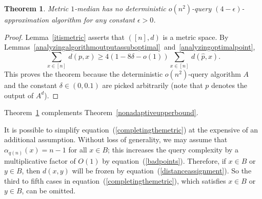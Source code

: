 \documentclass[letterpaper,12pt]{article}
\newtheorem{theorem}{Theorem}
\begin{document}
\begin{theorem}\label{maintheorem}
{\sc Metric $1$-median} has no deterministic $o(n^2)$-query
$(4-\epsilon)$-approximation algorithm for any constant $\epsilon>0$.
\end{theorem}
\begin{proof}
Lemma~\ref{itismetric} asserts that $([n],d)$ is a metric space.
By
Lemmas~\ref{analyzingalgorithmoutputassuboptimal}~and~\ref{analyzingoptimalpoint},
$$
\sum_{x\in[n]}\,d\left(p,x\right)
\ge 4\left(1-8\delta-o(1)\right)\sum_{x\in[n]}\, d\left(\hat{p},x\right).
$$
This proves the theorem because
the deterministic $o(n^2)$-query algorithm $A$
and
the constant $\delta\in(0,0.1)$
are picked arbitrarily (note that $p$ denotes the output of $A^d$).
\end{proof}

Theorem~\ref{maintheorem}
complements
Theorem~\ref{nonadaptiveupperbound}.

It is possible to
simplify equation~(\ref{completingthemetric})
at the expensive of an additional assumption.
Without loss of generality, we may assume that $\alpha_{q(n)}(x)=n-1$
for all $x\in B$; this increases the query complexity by a multiplicative
factor of $O(1)$ by equation~(\ref{badpoints}).
Therefore, if $x\in B$ or $y\in B$, then
$d(x,y)$ will be frozen by equation~(\ref{distanceassignment}).
So the third to fifth
cases
in equation~(\ref{completingthemetric}),
which satisfies $x\in B$ or $y\in B$,
can be omitted.
\end{document}
